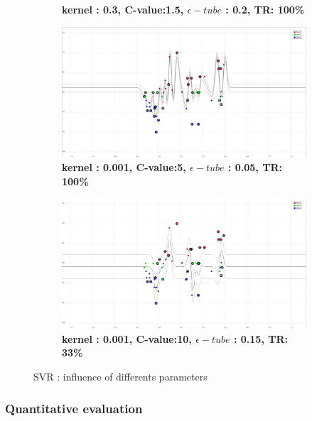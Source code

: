\begin{figure}[!ht]
\begin{subfigure}[h]{0.3\textwidth}
\caption{\bf kernel : 0.3, C-value:1.5, $\epsilon-tube$ : 0.2, TR: 100\%}
\label{fig_RBF_0_3_1_5_0_2_100}
\end{subfigure}
\begin{subfigure}[h]{0.3\textwidth}
\centering
\includegraphics[height=0.08\textheight]{./regression/RBF_0_001_5_0_05_100.png}
\caption{\bf kernel : 0.001, C-value:5, $\epsilon-tube$ : 0.05, TR: 100\%}
\label{fig_RBF_0_001_5_0_05_100}
\end{subfigure}
\begin{subfigure}[h]{0.3\textwidth}
\centering
\includegraphics[height=0.08\textheight]{./regression/RBF_0_001_10_0_15_33.png}
\caption{\bf kernel : 0.001, C-value:10, $\epsilon-tube$ : 0.15, TR: 33\%}
\label{fig_RBF_0_001_10_0_15_33}
\end{subfigure}

\caption{SVR : influence of differents parameters}
\end{figure}


\subsubsection{Quantitative evaluation}


